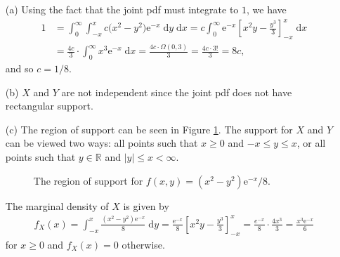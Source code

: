 \documentclass[10pt]{article}
\begin{document}
\begin{itemize}
    \item[(a)] 
    Using the fact that the joint pdf must integrate to \(1\), we have 
    \begin{align*}
        1 &= \int_0^{\infty} \int_{-x}^{x} c \big( x^2 - y^2 \big) \mathrm{e}^{-x} \;\mathrm{d}y \;\mathrm{d}x
        = c \int_0^{\infty} \mathrm{e}^{-x} \left[ x^2y - \frac{y^3}{3} \right]_{-x}^{x} \;\mathrm{d}x \\
        &= \frac{4c}{3} \cdot \int_0^{\infty} x^3 \mathrm{e}^{-x} \;\mathrm{d}x
        = \frac{4c \cdot \Omega(0,3)}{3} 
        = \frac{4c \cdot 3!}{3}
        = 8 c,
    \end{align*}
    and so \(c = 1/8\). 
    \item[(b)] \(X\) and \(Y\) are not independent since the joint pdf does not have rectangular support. 
    \item[(c)] The region of support can be seen in Figure \ref{q05-fig}.
    The support for \(X\) and \(Y\) can be viewed two ways: all points such that \(x \ge 0\) and \(-x \le y \le x\),
    or all points such that \(y \in \mathbb{R}\) and \(|y| \le x < \infty\). 
    \begin{figure}
        \centering
        
        \hspace{3em}
        
        \caption{The region of support for \(f(x,y) = (x^2 - y^2)\mathrm{e}^{-x}/8\).}
        \label{q05-fig}
    \end{figure}
    The marginal density of \(X\) is given by 
    \begin{align*}
        f_X(x) = \int_{-x}^x \frac{(x^2 - y^2)\mathrm{e}^{-x}}{8} \;\mathrm{d}y
        = \frac{\mathrm{e}^{-x}}{8} \left[ x^2y - \frac{y^3}{3} \right]_{-x}^x
        = \frac{e^{-x}}{8} \cdot \frac{4 x^3}{3}
        = \frac{x^3 \mathrm{e}^{-x}}{6}
    \end{align*}
    for \(x \ge 0\) and \(f_X(x) = 0\) otherwise.

\end{itemize}
\end{document}
